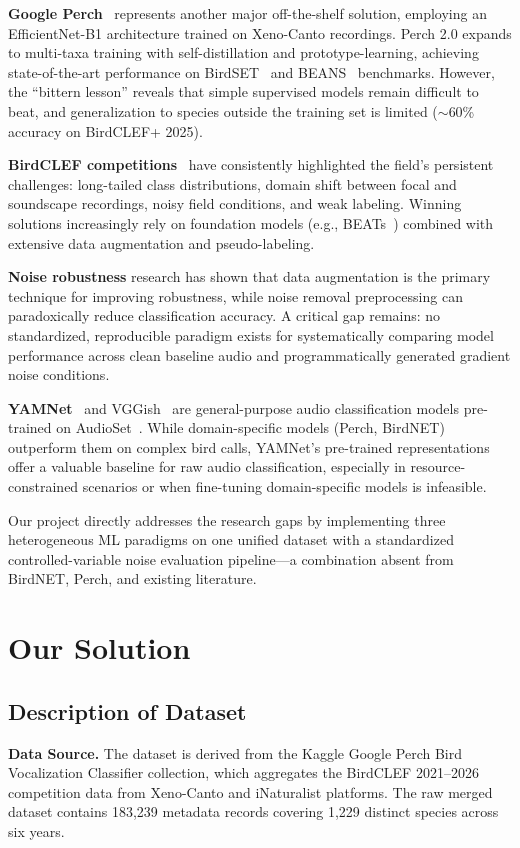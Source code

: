 \documentclass[conference]{IEEEtran}
\begin{document}
\textbf{Google Perch}~\cite{perch2025} represents another major off-the-shelf solution, employing an EfficientNet-B1 architecture trained on Xeno-Canto recordings. Perch 2.0 expands to multi-taxa training with self-distillation and prototype-learning, achieving state-of-the-art performance on BirdSET~\cite{rauch2024birdset} and BEANS~\cite{hagiwara2023beans} benchmarks. However, the ``bittern lesson'' reveals that simple supervised models remain difficult to beat, and generalization to species outside the training set is limited ($\sim$60\% accuracy on BirdCLEF+ 2025).

\textbf{BirdCLEF competitions}~\cite{birdclef2021_2026} have consistently highlighted the field's persistent challenges: long-tailed class distributions, domain shift between focal and soundscape recordings, noisy field conditions, and weak labeling. Winning solutions increasingly rely on foundation models (e.g., BEATs~\cite{chen2023beats}) combined with extensive data augmentation and pseudo-labeling.

\textbf{Noise robustness} research has shown that data augmentation is the primary technique for improving robustness, while noise removal preprocessing can paradoxically reduce classification accuracy. A critical gap remains: no standardized, reproducible paradigm exists for systematically comparing model performance across clean baseline audio and programmatically generated gradient noise conditions.

\textbf{YAMNet}~\cite{yamnet_tfhub} and VGGish~\cite{vggish} are general-purpose audio classification models pre-trained on AudioSet~\cite{gemmeke2017audioset}. While domain-specific models (Perch, BirdNET) outperform them on complex bird calls, YAMNet's pre-trained representations offer a valuable baseline for raw audio classification, especially in resource-constrained scenarios or when fine-tuning domain-specific models is infeasible.

Our project directly addresses the research gaps by implementing three heterogeneous ML paradigms on one unified dataset with a standardized controlled-variable noise evaluation pipeline---a combination absent from BirdNET, Perch, and existing literature.
\section{Our Solution}

\subsection{Description of Dataset}
\textbf{Data Source.} The dataset is derived from the Kaggle Google Perch Bird Vocalization Classifier collection, which aggregates the BirdCLEF 2021--2026 competition data from Xeno-Canto and iNaturalist platforms. The raw merged dataset contains 183,239 metadata records covering 1,229 distinct species across six years.
\end{document}
